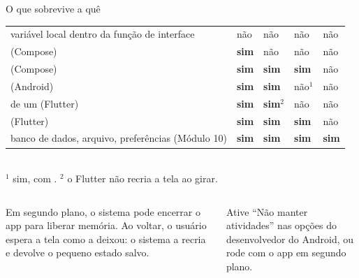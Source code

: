 \begin{frame}{O que sobrevive a quê}
  \scriptsize
  \newcommand{\vsim}{\textcolor{verdeok}{\textbf{sim}}}
  \newcommand{\vnao}{\textcolor{vermelhoerro}{não}}
  \begin{tabularx}{\textwidth}{@{}L *{4}{>{\centering\arraybackslash}p{1.95cm}}@{}}
    \toprule
     &  &  &  &  \\
    \midrule
    variável local dentro da função de interface & \vnao & \vnao & \vnao & \vnao \\
     (Compose) & \vsim & \vnao & \vnao & \vnao \\
     (Compose) & \vsim & \vsim & \vsim & \vnao \\
     (Android) & \vsim & \vsim & \vnao$^1$ & \vnao \\
     de um  (Flutter) & \vsim & \vsim$^2$ & \vnao & \vnao \\
     (Flutter) & \vsim & \vsim & \vsim & \vnao \\
    banco de dados, arquivo, preferências (Módulo 10) & \vsim & \vsim & \vsim & \vsim \\
    \bottomrule
  \end{tabularx}\\[1pt]
  {\tiny $^1$ sim, com . \quad $^2$ o Flutter não recria a tela ao girar.}
  \normalsize
  \begin{columns}[T]
    \begin{column}{0.49\textwidth}
      \begin{definicao}
        Em segundo plano, o sistema pode encerrar o app para liberar memória. Ao voltar, o usuário espera a tela como a deixou: o sistema a recria e devolve o pequeno estado salvo.
      \end{definicao}
    \end{column}
    \begin{column}{0.49\textwidth}
      \begin{dica}
        Ative ``Não manter atividades'' nas opções do desenvolvedor do Android, ou rode  com o app em segundo plano.
      \end{dica}
    \end{column}
  \end{columns}
\end{frame}

